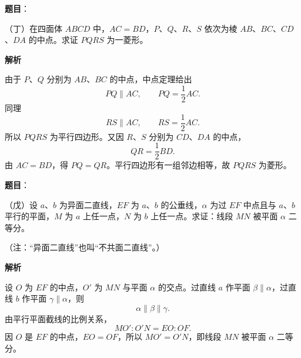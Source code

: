 \begin{answer}

\textbf{题目}：

（丁）在四面体 $ABCD$ 中，$AC=BD$，$P$、$Q$、$R$、$S$ 依次为棱 $AB$、$BC$、$CD$、$DA$ 的中点。求证 $PQRS$ 为一菱形。

\textbf{解析}
\nopagebreak[4]
\begin{center}\end{center}
\nopagebreak[4]
由于 $P$、$Q$ 分别为 $AB$、$BC$ 的中点，中点定理给出
\nopagebreak[4]
\[
PQ\parallel AC,\qquad PQ=\frac12AC.
\]
同理
\nopagebreak[4]
\[
RS\parallel AC,\qquad RS=\frac12AC.
\]
所以 $PQRS$ 为平行四边形。又因 $R$、$S$ 分别为 $CD$、$DA$ 的中点，
\nopagebreak[4]
\[
QR=\frac12BD.
\]
由 $AC=BD$，得 $PQ=QR$。平行四边形有一组邻边相等，故 $PQRS$ 为菱形。


\end{answer}
\begin{answer}

\textbf{题目}：

（戊）设 $a$、$b$ 为异面二直线，$EF$ 为 $a$、$b$ 的公垂线，$\alpha$ 为过 $EF$ 中点且与 $a$、$b$ 平行的平面，$M$ 为 $a$ 上任一点，$N$ 为 $b$ 上任一点。求证：线段 $MN$ 被平面 $\alpha$ 二等分。

（注：“异面二直线”也叫“不共面二直线”。）

\textbf{解析}
\nopagebreak[4]
\begin{center}\end{center}
\nopagebreak[4]
设 $O$ 为 $EF$ 的中点，$O'$ 为 $MN$ 与平面 $\alpha$ 的交点。过直线 $a$ 作平面 $\beta\parallel\alpha$，过直线 $b$ 作平面 $\gamma\parallel\alpha$，则
\nopagebreak[4]
\[
\alpha\parallel\beta\parallel\gamma.
\]
由平行平面截线的比例关系，
\nopagebreak[4]
\[
MO':O'N=EO:OF.
\]
因 $O$ 是 $EF$ 的中点，$EO=OF$，所以 $MO'=O'N$，即线段 $MN$ 被平面 $\alpha$ 二等分。


\end{answer}

